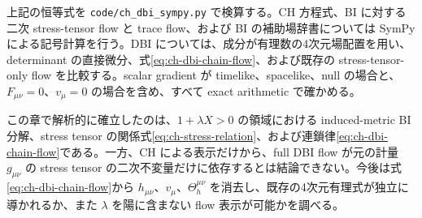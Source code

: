 上記の恒等式を \texttt{code/ch\_dbi\_sympy.py} で検算する。CH 方程式、BI に対する二次 stress-tensor flow と trace flow、および BI の補助場辞書については SymPy による記号計算を行う。DBI については、成分が有理数の4次元場配置を用い、determinant の直接微分、式\eqref{eq:ch-dbi-chain-flow}、および既存の stress-tensor-only flow を比較する。scalar gradient が timelike、spacelike、null の場合と、$F_{\mu\nu}=0$、$v_\mu=0$ の場合を含め、すべて exact arithmetic で確かめる。

この章で解析的に確立したのは、$1+\lambda X>0$ の領域における induced-metric BI 分解、stress tensor の関係式\eqref{eq:ch-stress-relation}、および連鎖律\eqref{eq:ch-dbi-chain-flow}である。一方、CH による表示だけから、full DBI flow が元の計量 $g_{\mu\nu}$ の stress tensor の二次不変量だけに依存するとは結論できない。今後は式\eqref{eq:ch-dbi-chain-flow}から $h_{\mu\nu}$、$v_\mu$、$\Theta_h^{\mu\nu}$ を消去し、既存の4次元有理式が独立に導かれるか、また $\lambda$ を陽に含まない flow 表示が可能かを調べる。
